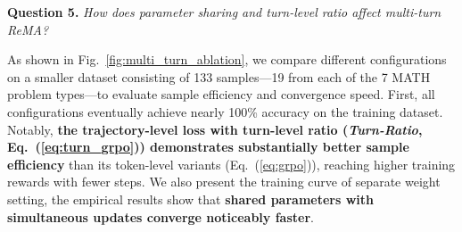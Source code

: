 

\textbf{Question 5.} \textit{How does parameter sharing and turn-level ratio affect multi-turn ReMA?}

As shown in Fig.~\ref{fig:multi_turn_ablation}, we compare different configurations on a smaller dataset consisting of 133 samples---19 from each of the 7 MATH problem types---to evaluate sample efficiency and convergence speed.
First, all configurations eventually achieve nearly 100\% accuracy on the training dataset. Notably, \textbf{the trajectory-level loss with turn-level ratio (\textit{Turn-Ratio}, Eq.~(\ref{eq:turn_grpo})) demonstrates substantially better sample efficiency} than its token-level variants (Eq.~(\ref{eq:grpo})), reaching higher training rewards with fewer steps.
We also present the training curve of separate weight setting, the empirical results show that \textbf{shared parameters with simultaneous updates converge noticeably faster}.